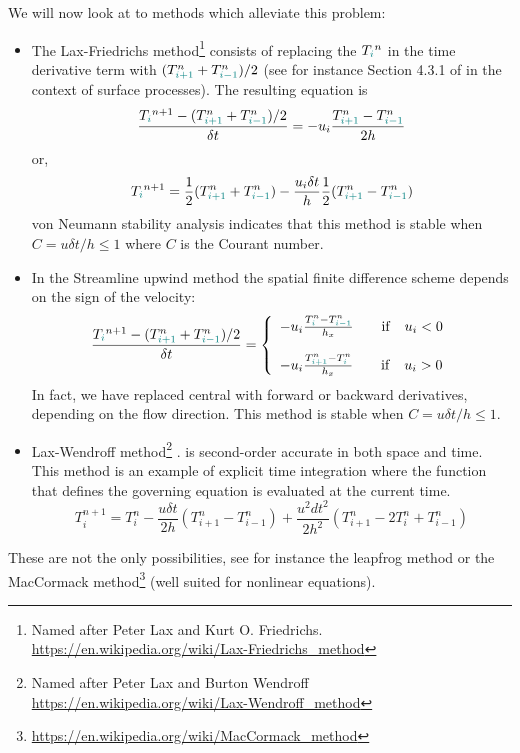 We will now look at to methods which alleviate this problem:

\begin{itemize}
\item The {\color{olive} Lax-Friedrichs method}\footnote{Named after Peter Lax 
and Kurt O. Friedrichs. \url{https://en.wikipedia.org/wiki/Lax-Friedrichs_method}} consists of replacing the $T_{\color{teal}i}^n$ 
in the time derivative term with $(T_{{\color{teal}i+1}}^n + T_{{\color{teal}i-1}}^n)/2$
(see for instance Section 4.3.1 of \cite{pell08} in the context of surface processes). 
The resulting equation is
\[
\frac{T_{\color{teal}i}^{n+1}-  (T_{{\color{teal}i+1}}^n + T_{{\color{teal}i-1}}^n)/2 }{\delta t} 
= - u_i \frac{T^n_{{\color{teal}i+1}}-T^n_{{\color{teal}i-1}}}{2 h}
\]
or, 
\[
T_{\color{teal}i}^{n+1} = \frac{1}{2} (T_{{\color{teal}i+1}}^n + T_{{\color{teal}i-1}}^n)  
- \frac{u_i \delta t}{h}  \frac{1}{2} (T^n_{{\color{teal}i+1}}-T^n_{{\color{teal}i-1}})
\]
von Neumann stability analysis indicates that this method is stable
when $C=u \delta t/h \leq 1$ where $C$ is the Courant number.
\item In the {\color{olive}Streamline upwind} method the spatial finite difference scheme 
depends on the sign of the velocity:
\[
\frac{T_{\color{teal}i}^{n+1}-  (T_{{\color{teal}i+1}}^n + T_{{\color{teal}i-1}}^n)/2   }{\delta t} =
\left\{
\begin{array}{l}
 - u_i \frac{T^n_{{\color{teal}i}}-T^n_{{\color{teal}i-1}}}{h_x}  \quad\quad  {\rm if} \quad u_i<0\\ \\
 - u_i \frac{T^n_{{\color{teal}i+1}}-T^n_{{\color{teal}i}}}{h_x}  \quad\quad  {\rm if} \quad u_i>0
\end{array}
\right.
\]
In fact, we have replaced central with forward or backward derivatives, depending on the flow direction. 
This method is stable when $C=u \delta t/h \leq 1$. 

\item {\color{olive} Lax-Wendroff method}\footnote{Named after Peter Lax 
and Burton Wendroff \url{https://en.wikipedia.org/wiki/Lax-Wendroff_method}} \cite{hoch}.
is second-order accurate in both space and time. 
This method is an example of explicit time integration where the function that defines the governing equation is evaluated at the current time. 
\[
T^{n+1}_i = T_i^n - \frac{u \delta t}{2 h} (T_{i+1}^n-T_{i-1}^n)
+ \frac{u^2 dt^2}{2 h^2} (T_{i+1}^n-2 T_i^n+T_{i-1}^n)
\]








\end{itemize}
These are not the only possibilities, see for instance 
the {\color{olive} leapfrog method} or the
MacCormack method\footnote{\url{https://en.wikipedia.org/wiki/MacCormack_method}} (well suited for nonlinear equations).  




